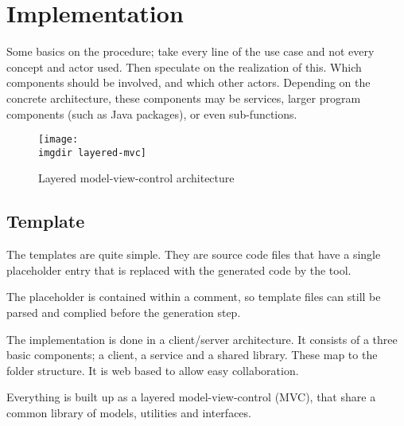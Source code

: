\chapter{Implementation}
Some basics on the procedure; take every line of the use case and not every concept and actor used. Then speculate on the realization of this. Which components should be involved, and which other actors. Depending on the concrete architecture, these components may be services, larger program components (such as Java packages), or even sub-functions.
\begin{figure}[!htbp]
  \centering
  \texttt{[image: \\imgdir layered-mvc]}
  \caption{Layered model-view-control architecture}
  \label{fig:layered-mvc}
\end{figure}

\section{Template}
The templates are quite simple. They are source code files that have a single placeholder entry that is replaced with the generated code by the tool.

The placeholder is contained within a comment, so template files can still be parsed and complied before the generation step.


The implementation is done in a client/server architecture. It consists of a three basic components; a client, a service and a shared library. These map to the folder structure. It is web based to allow easy collaboration.


Everything is built up as a layered model-view-control (MVC), that share a common library of models, utilities and interfaces.


